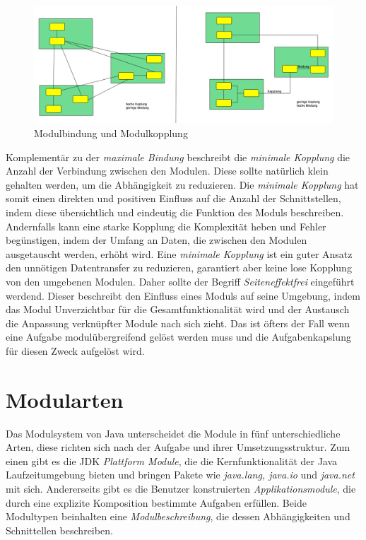     \begin{figure}[h]
      \includegraphics[width=\textwidth]{material/images/kopplung.png}
      \caption{Modulbindung und Modulkopplung}
      \label{fig:kopplung}
    \end{figure}

    Komplementär zu der \textit{maximale Bindung} beschreibt die \textit{minimale Kopplung} die Anzahl der Verbindung zwischen den Modulen. Diese sollte natürlich klein gehalten werden, um die Abhängigkeit zu reduzieren. Die \textit{minimale Kopplung} hat somit einen direkten und positiven Einfluss auf die Anzahl der Schnittstellen, indem diese übersichtlich und eindeutig die Funktion des Moduls beschreiben. Andernfalls kann eine starke Kopplung die Komplexität heben und Fehler begünstigen, indem der Umfang an Daten, die zwischen den Modulen ausgetauscht werden, erhöht wird. Eine \textit{minimale Kopplung} ist ein guter Ansatz den unnötigen Datentransfer zu reduzieren, garantiert aber keine lose Kopplung von den umgebenen Modulen. Daher sollte der Begriff \textit{Seiteneffektfrei} eingeführt werdend. Dieser beschreibt den Einfluss eines Moduls auf seine Umgebung, indem das Modul Unverzichtbar für die Gesamtfunktionalität wird und der Austausch die Anpassung verknüpfter Module nach sich zieht. Das ist öfters der Fall wenn eine Aufgabe modulübergreifend gelöst werden muss und die Aufgabenkapslung für diesen Zweck aufgelöst wird.

  \section{Modularten} \label{Modularten}
    Das Modulsystem von Java unterscheidet die Module in fünf unterschiedliche Arten, diese richten sich nach der Aufgabe und ihrer Umsetzungsstruktur. Zum einen gibt es die JDK \textit{Plattform Module}, die die Kernfunktionalität der Java Laufzeitumgebung bieten und bringen Pakete wie \textit{java.lang, java.io} und \textit{java.net} mit sich. 
    Andererseits gibt es die Benutzer konstruierten \textit{Applikationsmodule}, die durch eine explizite Komposition bestimmte Aufgaben erfüllen. Beide Modultypen beinhalten eine \textit{Modulbeschreibung}, die dessen Abhängigkeiten und Schnittellen beschreiben. 
    
